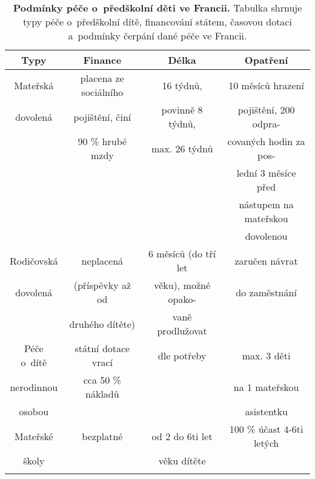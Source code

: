 		\begin{spacing}{1.0}
		\begin{table}[ht]
			\center
			\small
			\begin{center}
			\begin{tabular}{|c|c|c|c|}
				\hline
				\rowcolor{grey}		
				\textbf{Typy}	&	\textbf{Finance} & 	\textbf{Délka} 	&	\textbf{Opatření} 	\\
				\hline
				\hline
				\rowcolor{grey!10}
				Mateřská	&  placena ze sociálního &  16 týdnů, 		 & 10 měsíců hrazení 		\\ \rowcolor{grey!10}
				dovolená 	& 	 pojištění, činí  	 & 	povinně 8 týdnů, & pojištění, 200 odpra- 	\\ \rowcolor{grey!10}
				 			& 	90 \% hrubé mzdy 	 &  max. 26 týdnů 	 & covaných hodin za pos- 	\\ \rowcolor{grey!10}
				 			&						 & 					 & lední 3 měsíce před 		\\ \rowcolor{grey!10}
				 			&						 &					 & nástupem na mateřskou 	\\ \rowcolor{grey!10}
				 			&						 & 					 & dovolenou 				\\ \rowcolor{grey!10}
				\hline
				Rodičovská	& neplacená & 6 měsíců (do tří let 		& 	zaručen návrat 	\\ \rowcolor{grey!10}
				dovolená & (příspěvky až od & věku), možné opako-  	&  do zaměstnání	\\ \rowcolor{grey!10}
						 & druhého dítěte)  & vaně prodlužovat						&	\\ \rowcolor{grey!10}
				 \hline
				Péče o~dítě	&	státní dotace vrací	&	dle potřeby	& max. 3 děti \\ \rowcolor{grey!10}
				nerodinnou 	&	cca 50 \% nákladů 	&	& na 1 mateřskou 	\\ \rowcolor{grey!10}
				osobou 		& 						&	& asistentku		\\ \rowcolor{grey!10}
				\hline
				Mateřské 	&	bezplatné	& od 2 do 6ti let	& 100 \% účast 4-6ti letých \\ \rowcolor{grey!10}
				školy 		& 	 			& věku dítěte	& 						\\ \rowcolor{grey!10}
				\hline
			\end{tabular}
			\end{center}
			\label{tab:peceFR}
			\caption{
				\textbf{Podmínky péče o~předškolní děti ve Francii.}
				Tabulka shrnuje typy péče o~předškolní dítě, financování státem, časovou dotaci a~podmínky čerpání dané péče ve Francii.
							}
		\end{table}
		\end{spacing}

